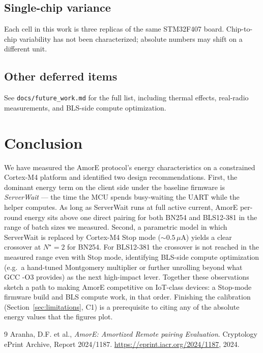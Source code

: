 \documentclass[11pt,a4paper]{article}
\begin{document}
\subsection{Single-chip variance}

Each cell in this work is three replicas of the same STM32F407
board. Chip-to-chip variability has not been characterized;
absolute numbers may shift on a different unit.

\subsection{Other deferred items}

See \texttt{docs/future\_work.md} for the full list, including
thermal effects, real-radio measurements, and BLS-side compute
optimization.

\section{Conclusion}

We have measured the AmorE protocol's energy characteristics on a
constrained Cortex-M4 platform and identified two design
recommendations. First, the dominant energy term on the client side
under the baseline firmware is \emph{ServerWait} --- the time the
MCU spends busy-waiting the UART while the helper computes. As long
as ServerWait runs at full active current, AmorE per-round energy
sits above one direct pairing for both BN254 and BLS12-381 in the
range of batch sizes we measured. Second, a parametric model in
which ServerWait is replaced by Cortex-M4 Stop mode
($\sim\!0.5\,\mu$A) yields a clear crossover at $N^{\star}\!=\!2$
for BN254. For BLS12-381 the crossover is not reached in the
measured range even with Stop mode, identifying BLS-side compute
optimization (e.g.\ a hand-tuned Montgomery multiplier or further
unrolling beyond what GCC -O3 provides) as the next high-impact
lever. Together these observations sketch a path to making AmorE
competitive on IoT-class devices: a Stop-mode firmware build and
BLS compute work, in that order. Finishing the calibration
(Section~\ref{sec:limitations}, C1) is a prerequisite to citing
any of the absolute energy values that the figures plot.



\begin{thebibliography}{9}
Aranha, D.F. et al., \emph{AmorE: Amortized Remote pairing Evaluation}.
Cryptology ePrint Archive, Report 2024/1187.
\url{https://eprint.iacr.org/2024/1187}, 2024.
\end{thebibliography}
\end{document}
